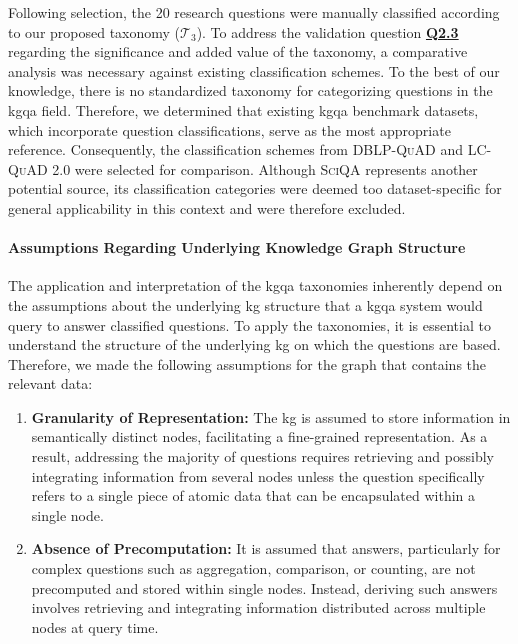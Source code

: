 Following selection, the 20 research questions were manually classified according to our proposed taxonomy ($\mathcal{T}_3$). To address the validation question \hyperref[tab:gqm_taxonomy_validation]{\textbf{Q2.3}} regarding the significance and added value of the taxonomy, a comparative analysis was necessary against existing classification schemes. To the best of our knowledge, there is no standardized taxonomy for categorizing questions in the \gls{kgqa} field. Therefore, we determined that existing \gls{kgqa} benchmark datasets, which incorporate question classifications, serve as the most appropriate reference. Consequently, the classification schemes from \textsc{DBLP-QuAD} \cite{banerjee_dblp-quad_2023} and \textsc{LC-QuAD 2.0} \cite{dubey_lc-quad_2019} were selected for comparison. Although \textsc{SciQA} represents another potential source, its classification categories were deemed too dataset-specific for general applicability in this context and were therefore excluded.

\paragraph{Assumptions Regarding Underlying Knowledge Graph Structure}
The application and interpretation of the \gls{kgqa} taxonomies inherently depend on the assumptions about the underlying \gls{kg} structure that a \gls{kgqa} system would query to answer classified questions. To apply the taxonomies, it is essential to understand the structure of the underlying \gls{kg} on which the questions are based. Therefore, we made the following assumptions for the graph that contains the relevant data:

\begin{enumerate} 
    \item \textbf{Granularity of Representation:} The \gls{kg} is assumed to store information in semantically distinct nodes, facilitating a fine-grained representation. As a result, addressing the majority of questions requires retrieving and possibly integrating information from several nodes unless the question specifically refers to a single piece of atomic data that can be encapsulated within a single node.
    \item \textbf{Absence of Precomputation:} It is assumed that answers, particularly for complex questions such as aggregation, comparison, or counting, are not precomputed and stored within single nodes. Instead, deriving such answers involves retrieving and integrating information distributed across multiple nodes at query time.
\end{enumerate}

